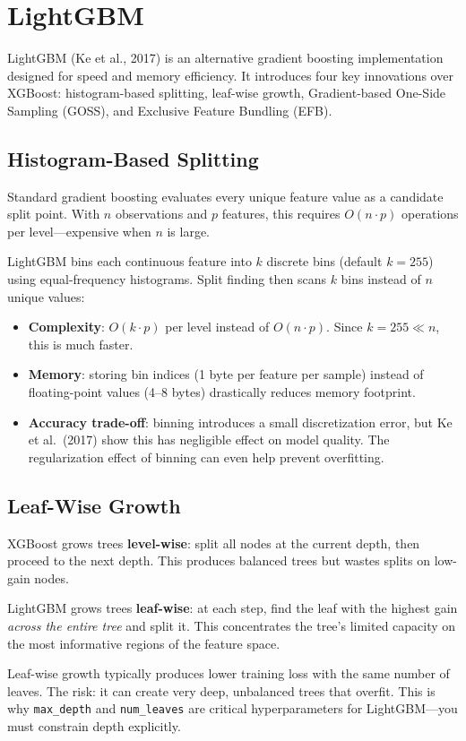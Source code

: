 \section{LightGBM}
\label{sec:lightgbm}

LightGBM (Ke et al., 2017) is an alternative gradient boosting implementation designed for speed and memory efficiency.
It introduces four key innovations over XGBoost: histogram-based splitting, leaf-wise growth, Gradient-based One-Side Sampling (GOSS), and Exclusive Feature Bundling (EFB).

\subsection{Histogram-Based Splitting}

Standard gradient boosting evaluates every unique feature value as a candidate split point.
With $n$ observations and $p$ features, this requires $O(n \cdot p)$ operations per level---expensive when $n$ is large.

LightGBM bins each continuous feature into $k$ discrete bins (default $k = 255$) using equal-frequency histograms.
Split finding then scans $k$ bins instead of $n$ unique values:
\begin{itemize}[nosep]
  \item \textbf{Complexity}: $O(k \cdot p)$ per level instead of $O(n \cdot p)$. Since $k = 255 \ll n$, this is much faster.
  \item \textbf{Memory}: storing bin indices (1 byte per feature per sample) instead of floating-point values (4--8 bytes) drastically reduces memory footprint.
  \item \textbf{Accuracy trade-off}: binning introduces a small discretization error, but Ke et al.\ (2017) show this has negligible effect on model quality. The regularization effect of binning can even help prevent overfitting.
\end{itemize}

\subsection{Leaf-Wise Growth}

\begin{keyidea}
XGBoost grows trees \textbf{level-wise}: split all nodes at the current depth, then proceed to the next depth.
This produces balanced trees but wastes splits on low-gain nodes.

LightGBM grows trees \textbf{leaf-wise}: at each step, find the leaf with the highest gain \emph{across the entire tree} and split it.
This concentrates the tree's limited capacity on the most informative regions of the feature space.

Leaf-wise growth typically produces lower training loss with the same number of leaves.
The risk: it can create very deep, unbalanced trees that overfit.
This is why \texttt{max\_depth} and \texttt{num\_leaves} are critical hyperparameters for LightGBM---you must constrain depth explicitly.
\end{keyidea}

